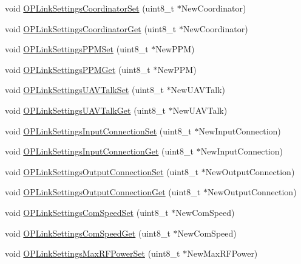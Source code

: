 \begin{DoxyCompactItemize}
\item 
void \hyperlink{group___o_p_link_settings_ga17502bb5cfa29ebd962663eaab3b6d40}{\-O\-P\-Link\-Settings\-Coordinator\-Set} (uint8\-\_\-t $\ast$\-New\-Coordinator)
\item 
void \hyperlink{group___o_p_link_settings_gae5fe29eaa47b942015bc056fabf570d7}{\-O\-P\-Link\-Settings\-Coordinator\-Get} (uint8\-\_\-t $\ast$\-New\-Coordinator)
\item 
void \hyperlink{group___o_p_link_settings_gac07e8f5d0349bc06ee0942be695386e4}{\-O\-P\-Link\-Settings\-P\-P\-M\-Set} (uint8\-\_\-t $\ast$\-New\-P\-P\-M)
\item 
void \hyperlink{group___o_p_link_settings_ga6e3a4de5b21883f40e58f2f46a1eb6b4}{\-O\-P\-Link\-Settings\-P\-P\-M\-Get} (uint8\-\_\-t $\ast$\-New\-P\-P\-M)
\item 
void \hyperlink{group___o_p_link_settings_ga0f83a1d15db52ee26f2a93efc4bd0752}{\-O\-P\-Link\-Settings\-U\-A\-V\-Talk\-Set} (uint8\-\_\-t $\ast$\-New\-U\-A\-V\-Talk)
\item 
void \hyperlink{group___o_p_link_settings_ga4e17d1973731a583d1fac579fcae6b32}{\-O\-P\-Link\-Settings\-U\-A\-V\-Talk\-Get} (uint8\-\_\-t $\ast$\-New\-U\-A\-V\-Talk)
\item 
void \hyperlink{group___o_p_link_settings_ga89009f83e362e349a9b9f4e543140c5f}{\-O\-P\-Link\-Settings\-Input\-Connection\-Set} (uint8\-\_\-t $\ast$\-New\-Input\-Connection)
\item 
void \hyperlink{group___o_p_link_settings_ga0e0131c15b9c03c607e31a677a596756}{\-O\-P\-Link\-Settings\-Input\-Connection\-Get} (uint8\-\_\-t $\ast$\-New\-Input\-Connection)
\item 
void \hyperlink{group___o_p_link_settings_ga2ab45e537541bc71048a18bdc327171a}{\-O\-P\-Link\-Settings\-Output\-Connection\-Set} (uint8\-\_\-t $\ast$\-New\-Output\-Connection)
\item 
void \hyperlink{group___o_p_link_settings_gacf118f21fe99729428da911c102401f9}{\-O\-P\-Link\-Settings\-Output\-Connection\-Get} (uint8\-\_\-t $\ast$\-New\-Output\-Connection)
\item 
void \hyperlink{group___o_p_link_settings_ga6e9071db2894b4f1c10173dfd7ec32c0}{\-O\-P\-Link\-Settings\-Com\-Speed\-Set} (uint8\-\_\-t $\ast$\-New\-Com\-Speed)
\item 
void \hyperlink{group___o_p_link_settings_gaea3f13d6b087c6c393a4b9f6712505af}{\-O\-P\-Link\-Settings\-Com\-Speed\-Get} (uint8\-\_\-t $\ast$\-New\-Com\-Speed)
\item 
void \hyperlink{group___o_p_link_settings_ga47c5732ca22132ccd6b45a2ba4fc226e}{\-O\-P\-Link\-Settings\-Max\-R\-F\-Power\-Set} (uint8\-\_\-t $\ast$\-New\-Max\-R\-F\-Power)

\end{DoxyCompactItemize}
